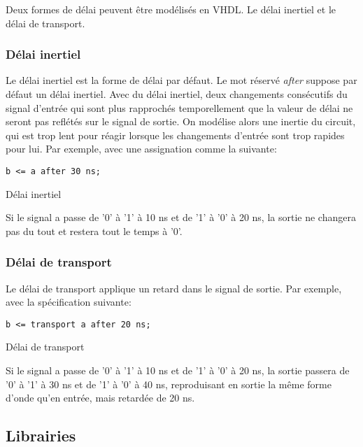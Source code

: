 \documentclass[11pt]{article}
\begin{document}
Deux formes de délai peuvent être modélisés en VHDL. Le délai inertiel
et le délai de transport.

\subsubsection{Délai inertiel}
\label{sec:org3ad0b25}

Le délai inertiel est la forme de délai par défaut. Le mot réservé
\emph{after} suppose par défaut un délai inertiel. Avec du délai inertiel,
deux changements consécutifs du signal d'entrée qui sont plus
rapprochés temporellement que la valeur de délai ne seront pas
reflétés sur le signal de sortie. On modélise alors une inertie du
circuit, qui est trop lent pour réagir lorsque les changements
d'entrée sont trop rapides pour lui. Par exemple, avec une
assignation comme la suivante:

\begin{listing}[htbp]
\begin{verbatim}
b <= a after 30 ns;
\end{verbatim}
\caption{Délai inertiel}
\end{listing}

Si le signal a passe de '0' à '1' à 10 ns et de '1' à '0' à 20 ns, la
sortie ne changera pas du tout et restera tout le temps à '0'.

\subsubsection{Délai de transport}
\label{sec:orga1c1534}

Le délai de transport applique un retard dans le signal de sortie. Par
exemple, avec la spécification suivante:

\begin{listing}[htbp]
\begin{verbatim}
b <= transport a after 20 ns;
\end{verbatim}
\caption{Délai de transport}
\end{listing}
Si le signal a passe de '0' à '1' à 10 ns et de '1' à '0' à 20 ns, la
sortie passera de '0' à '1' à 30 ns et de '1' à '0' à 40 ns,
reproduisant en sortie la même forme d'onde qu'en entrée, mais
retardée de 20 ns.

\subsection{Librairies}
\label{sec:org8c6d40a}
\end{document}
